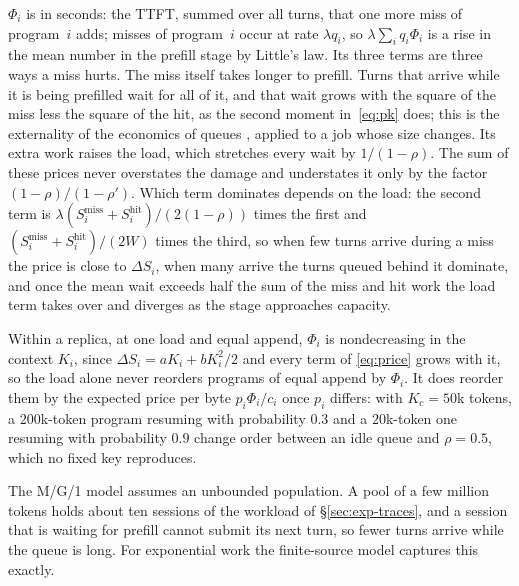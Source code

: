 \documentclass{article}
\newcommand{\leanref}[1]{}
\newcommand{\provedby}[1]{}
\theoremstyle{plain}
\theoremstyle{definition}
\theoremstyle{remark}
\begin{document}
$\Phi_i$ is in seconds: the TTFT, summed over all turns, that one more
miss of program~$i$ adds; misses of program~$i$ occur at rate
$\lambda q_i$, so $\lambda\sum_iq_i\Phi_i$ is a rise in the mean number
in the prefill stage by Little's law. Its three terms are three ways a
miss hurts. The miss itself takes longer to prefill. Turns that arrive
while it is being prefilled wait for all of it, and that wait grows
with the square of the miss less the square of the hit, as the second
moment in~\eqref{eq:pk} does; this is the externality of the economics
of queues \citep{naor1969,mendelson1990}, applied to a job whose size
changes. Its extra work raises the load, which stretches every wait by
$1/(1-\rho)$. The sum of these prices never overstates the damage and
understates it only by the factor $(1-\rho)/(1-\rho')$. Which term
dominates depends on the load: the second term is
$\lambda(S_i^{\mathrm{miss}}+S_i^{\mathrm{hit}})/(2(1-\rho))$ times the
first and $(S_i^{\mathrm{miss}}+S_i^{\mathrm{hit}})/(2W)$ times the
third,\provedby{\leanref{missPrice\_own\_vs\_queue\_ratio}, \leanref{missPrice\_queue\_terms\_ratio}}
so when few turns arrive during a miss the price is close to
$\Delta S_i$, when many arrive the turns queued behind it dominate, and
once the mean wait exceeds half the sum of the miss and hit work the
load term takes over and
diverges as the stage approaches capacity.\provedby{\leanref{missPrice\_unbounded}}

Within a replica, at one load and equal append, $\Phi_i$ is
nondecreasing in the context $K_i$, since $\Delta S_i=aK_i+bK_i^2/2$
and every term of \eqref{eq:price} grows with
it,\provedby{\leanref{prefillWork\_miss\_delta}, \leanref{missPrice\_mono\_context}}
so the load alone never reorders programs of equal append by $\Phi_i$.
It does reorder them by the expected price per byte $p_i\Phi_i/c_i$
once $p_i$ differs: with $K_c=50$k tokens, a $200$k-token program
resuming with probability $0.3$ and a $20$k-token one resuming with
probability $0.9$ change order between an idle queue and
$\rho=0.5$,\provedby{\leanref{price\_order\_flips\_with\_load}} which
no fixed key reproduces.

The M/G/1 model assumes an unbounded population. A pool of a few
million tokens holds about ten sessions of the workload of
\S\ref{sec:exp-traces}, and a session that is waiting for prefill
cannot submit its next turn, so fewer turns arrive while the queue is
long. For exponential work the finite-source model captures this
exactly.
\end{document}
